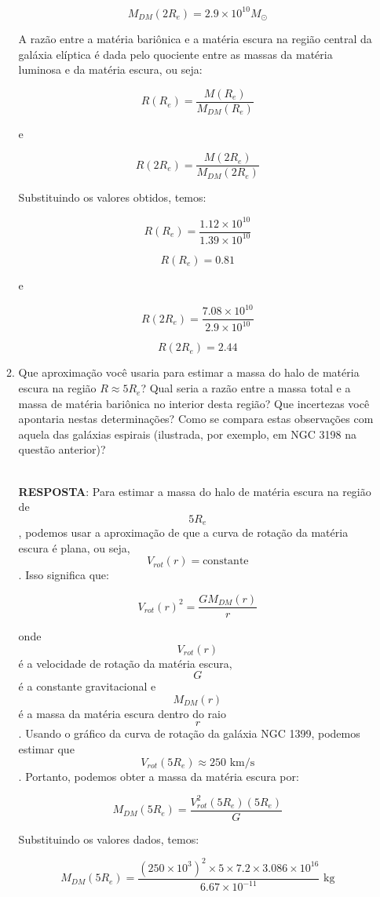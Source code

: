 \documentclass[a4paper,12pt]{article}
\begin{document}
\begin{enumerate}
\begin{enumerate}
$$M_{DM}(2 R_e) = 2.9\times 10^{10} M_{\odot}$$

A razão entre a matéria bariônica e a matéria escura na região central da galáxia elíptica é dada pelo quociente entre as massas da matéria luminosa e da matéria escura, ou seja:

$$R(R_e) = \frac{M(R_e)}{M_{DM}(R_e)}$$

e

$$R(2 R_e) = \frac{M(2 R_e)}{M_{DM}(2 R_e)}$$

Substituindo os valores obtidos, temos:

$$R(R_e) = \frac{1.12\times 10^{10}}{1.39\times 10^{10}}$$

$$R(R_e) = 0.81$$

e

$$R(2 R_e) = \frac{7.08\times 10^{10}}{2.9\times 10^{10}}$$

$$R(2 R_e) = 2.44$$

\noindent\hrulefill

\item Que aproximação você usaria para estimar a massa do halo de matéria escura na região $R \approx 5 R_e$? Qual seria a razão entre a massa total e a massa de matéria bariônica no interior desta região? Que incertezas você apontaria nestas determinações? Como se compara estas observações com aquela das galáxias espirais (ilustrada, por exemplo, em NGC 3198 na questão anterior)?

\noindent\hrulefill\\\textbf{RESPOSTA}: Para estimar a massa do halo de matéria escura na região de $$5 R_e$$, podemos usar a aproximação de que a curva de rotação da matéria escura é plana, ou seja, $$V_{rot}(r) = \text{constante}$$. Isso significa que:

$$V_{rot}(r)^2 = \frac{GM_{DM}(r)}{r}$$

onde $$V_{rot}(r)$$ é a velocidade de rotação da matéria escura, $$G$$ é a constante gravitacional e $$M_{DM}(r)$$ é a massa da matéria escura dentro do raio $$r$$. Usando o gráfico da curva de rotação da galáxia NGC 1399, podemos estimar que $$V_{rot}(5 R_e) \approx 250 \text{ km/s}$$. Portanto, podemos obter a massa da matéria escura por:

$$M_{DM}(5 R_e) = \frac{V_{rot}^2(5 R_e) (5 R_e)}{G}$$

Substituindo os valores dados, temos:

$$M_{DM}(5 R_e) = \frac{(250\times 10^3)^2 \times 5 \times 7.2 \times 3.086\times 10^{16}}{6.67\times 10^{-11}} \text{ kg}$$


\end{enumerate}
\end{enumerate}
\end{document}
